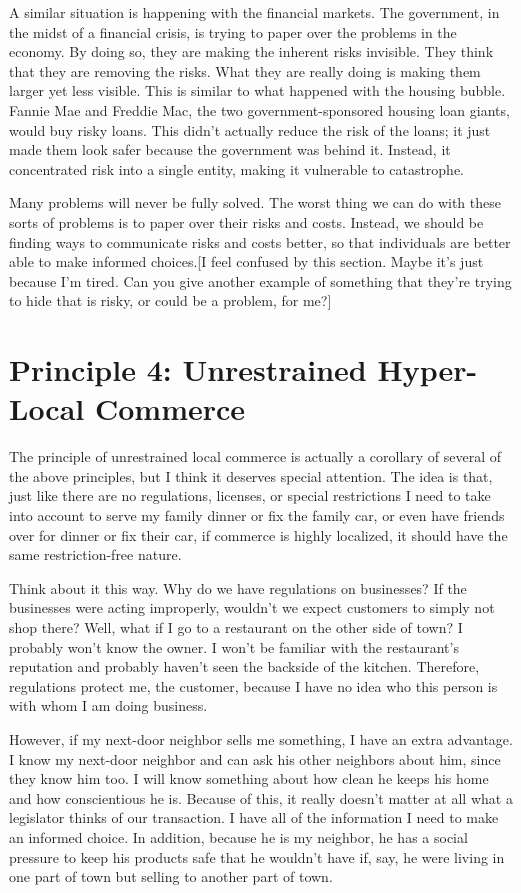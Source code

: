 A similar situation is happening with the financial markets. The
government, in the midst of
a financial crisis,
is trying to paper over the problems in the economy. By doing so, they
are making the inherent risks invisible. They think that they are
removing the risks. What they are really doing is making them larger
yet less visible. This is similar to what happened with the housing
bubble. Fannie Mae and Freddie Mac, the two government-sponsored
housing loan giants, would buy risky loans. This
didn't actually reduce the risk of the loans; it just
made them look safer because the government was behind it. Instead, it
concentrated risk into a single entity, making it vulnerable to
catastrophe.

Many problems will never be fully solved. The worst thing we can do with
these sorts of problems is to paper over their risks and costs.
Instead, we should be finding ways to communicate risks and costs
better, so that individuals are better able to make informed
choices.[I feel
confused by this section. Maybe it’s just because I’m tired. Can you
give another example of something that they’re trying to hide that is
risky, or could be a problem, for me?]

\section{Principle 4: Unrestrained Hyper-Local Commerce}

The principle of unrestrained local commerce is actually a corollary of
several of the above principles, but I think it deserves special
attention. The idea is that, just like there are no regulations,
licenses, or special restrictions I need to take into account to serve
my family dinner or fix the family car, or even have friends over for
dinner or fix their car, if commerce is highly localized, it should
have the same restriction-free nature.

Think about it this way. Why do we have regulations on businesses?  If
the businesses were acting improperly, wouldn't we
expect customers to simply not shop there?  Well,
what if I go to a
restaurant on the other side of town? I probably won't
know the owner. I won't be familiar with the
restaurant's reputation and probably haven’t seen the
backside of the kitchen. Therefore, regulations protect me, the
customer, because I have no idea who this person is with whom I am
doing business.

However, if my next-door neighbor sells me something, I have an extra
advantage. I know my next-door neighbor and can ask his other neighbors
about him, since they know him too. I will know something about how
clean he keeps his home and how conscientious he is. Because of this,
it really doesn't matter at all what a legislator
thinks of our transaction. I have all of the information I need to make
an informed choice. In addition, because he is my neighbor, he has a
social pressure to keep his products safe that he
wouldn't have if, say, he were living in one part of
town but selling to another part of town.

